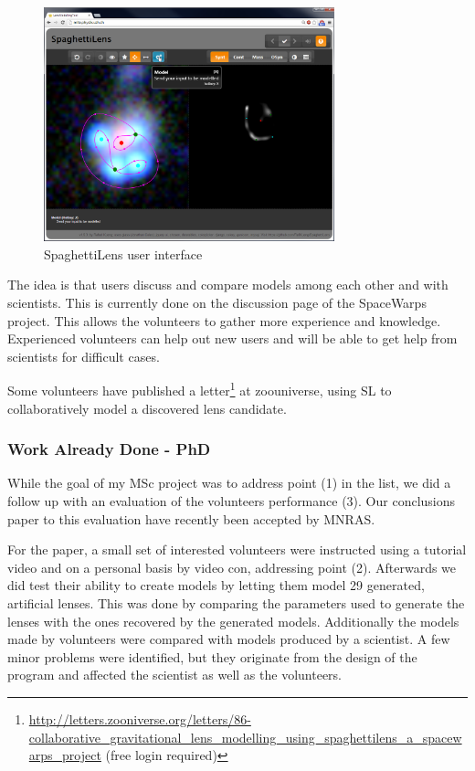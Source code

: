 \documentclass[11pt]{article}
\begin{document}
\begin{figure}
	\centering
		\includegraphics[width=0.75\textwidth]{img/client_screen.png}
	\caption{SpaghettiLens user interface}
	\label{fig:client_screen}
\end{figure}


The idea is that users discuss and compare models among each other and with scientists.
This is currently done on the discussion page of the SpaceWarps project.
This allows the volunteers to gather more experience and knowledge.
Experienced volunteers can help out new users and will be able to get help from scientists for difficult cases.

Some volunteers have published a letter\footnote{\url{http://letters.zooniverse.org/letters/86-collaborative_gravitational_lens_modelling_using_spaghettilens_a_spacewarps_project} (free login required)} at zoouniverse, using SL to collaboratively model a discovered lens candidate.


\subsubsection{Work Already Done - PhD}

While the goal of my MSc project was to address point (1) in the list, we did a follow up with an evaluation of the volunteers performance (3).
Our conclusions paper to this evaluation have recently been accepted by MNRAS\cite{spaghetti}.

For the paper, a small set of interested volunteers were instructed using a tutorial video and on a personal basis by video con, addressing point (2).
Afterwards we did test their ability to create models by letting them model 29 generated, artificial lenses.
This was done by comparing the parameters used to generate the lenses with the ones recovered by the generated models. Additionally the models made by volunteers were compared with models produced by a scientist.
A few minor problems were identified, but they originate from the design of the program and affected the scientist as well as the volunteers.
\end{document}
